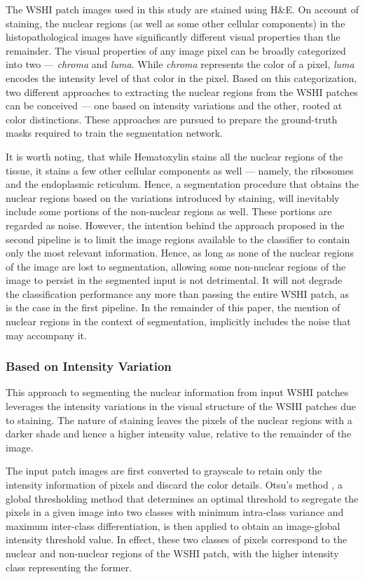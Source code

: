 \documentclass{comjnl}
\begin{document}
The WSHI patch images used in this study are stained using H\&E. On account of staining, the nuclear regions (as well as some other cellular components) in the histopathological images have significantly different visual properties than the remainder. The visual properties of any image pixel can be broadly categorized into two --- \emph{chroma} and \emph{luma}. While \emph{chroma} represents the color of a pixel, \emph{luma} encodes the intensity level of that color in the pixel. Based on this categorization, two different approaches to extracting the nuclear regions from the WSHI patches can be conceived --- one based on intensity variations and the other, rooted at color distinctions. These approaches are pursued to prepare the ground-truth masks required to train the segmentation network. 

It is worth noting, that while Hematoxylin stains all the nuclear regions of the tissue, it stains a few other cellular components as well --- namely, the ribosomes and the endoplasmic reticulum.  Hence, a segmentation procedure that obtains the nuclear regions based on the variations introduced by staining, will inevitably include some portions of the non-nuclear regions as well. These portions are regarded as noise. However, the intention behind the approach proposed in the second pipeline is to limit the image regions available to the classifier to contain only the most relevant information. Hence, as long as none of the nuclear regions of the image are lost to segmentation, allowing some non-nuclear regions of the image to persist in the segmented input is not detrimental. It will not degrade the classification performance any more than passing the entire WSHI patch, as is the case in the first pipeline. In the remainder of this paper, the mention of nuclear regions in the context of segmentation, implicitly includes the noise that may accompany it. 

\subsubsection{Based on Intensity Variation}

This approach to segmenting the nuclear information from input WSHI patches leverages the intensity variations in the visual structure of the WSHI patches due to staining. The nature of staining leaves the pixels of the nuclear regions with a darker shade and hence a higher intensity value, relative to the remainder of the image.

The input patch images are first converted to grayscale to retain only the intensity information of pixels \cite{hui_liu} and discard the color details. Otsu's method \cite{otsu}, a global thresholding method that determines an optimal threshold to segregate the pixels in a given image into two classes with minimum intra-class variance and maximum inter-class differentiation, is then applied to obtain an image-global intensity threshold value. In effect, these two classes of pixels correspond to the nuclear and non-nuclear regions of the WSHI patch, with the higher intensity class representing the former.
\end{document}
